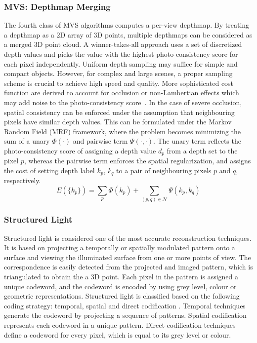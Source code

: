 \subsubsection{MVS: Depthmap Merging}
The fourth class of MVS algorithms computes a per-view depthmap. By treating a depthmap as a 2D array of 3D points, multiple depthmaps can be considered as a merged 3D point cloud. A winner-takes-all approach uses a set of discretized depth values and picks the value with the highest photo-consistency score for each pixel independently. Uniform depth sampling may suffice for simple and compact objects. However, for complex and large scenes, a proper sampling scheme is crucial to achieve high speed and quality. More sophisticated cost function are derived to account for occlusion or non-Lambertian effects which may add noise to the photo-consistency score~\cite{goesele2006multi,vogiatzis2007multiview}. In the case of severe occlusion, spatial consistency can be enforced under the assumption that neighbouring pixels have similar depth values. This can be formulated under the Markov Random Field (MRF) framework, where the problem becomes minimizing the sum of a unary $\Phi(\cdot)$ and pairwise term $\Psi(\cdot, \cdot)$. The unary term reflects the photo-consistency score of assigning a depth value $d_p$ from a depth set to the pixel $p$, whereas the pairwise term enforces the spatial regularization, and assigns the cost of setting depth label $k_p$, $k_q$ to a pair of neighbouring pixels $p$ and $q$, respectively.
$$
E(\{k_p\})= \sum_p \Phi(k_p) + \sum_{(p,q)\in\mathcal{N}}\Psi(k_p, k_q)
$$

\subsubsection{Structured Light}
Structured light is considered one of the most accurate reconstruction techniques. It is based on projecting a temporally or spatially modulated pattern onto a surface and viewing the illuminated surface from one or more points of view. The correspondence is easily detected from the projected and imaged pattern, which is triangulated to obtain the a 3D point. Each pixel in the pattern is assigned a unique codeword, and the codeword is encoded by using grey level, colour or geometric representations. Structured light is classified based on the following coding strategy: temporal, spatial and direct codification \cite{salvi2004pattern}. Temporal techniques generate the codeword by projecting a sequence of patterns. Spatial codification represents each codeword in a unique pattern. Direct codification techniques define a codeword for every pixel, which is equal to its grey level or colour.

